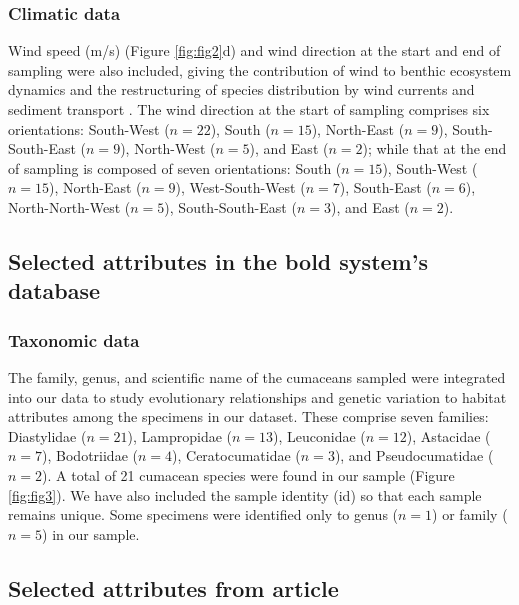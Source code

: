 \subsubsection{Climatic data} 
Wind speed (m/s) (Figure \ref{fig:fig2}d) and wind direction at the start and end of sampling were also included, giving the contribution of wind to benthic ecosystem dynamics and the restructuring of species distribution by wind currents and sediment transport \citep{siedlecki2016experiments, waga_recent_2020,saeedi_environmental_2022}. The wind direction at the start of sampling comprises six orientations: South-West ($n=22$), South ($n=15$), North-East ($n=9$), South-South-East ($n=9$), North-West ($n=5$), and East ($n=2$); while that at the end of sampling is composed of seven orientations: South ($n=15$), South-West ($n=15$), North-East ($n=9$), West-South-West ($n=7$), South-East ($n=6$), North-North-West ($n=5$), South-South-East ($n=3$), and East ($n=2$). 

\subsection{Selected attributes in the bold system's database}
\subsubsection{Taxonomic data} 
The family, genus, and scientific name of the cumaceans sampled were integrated into our data to study evolutionary relationships and genetic variation to habitat attributes among the specimens in our dataset. These comprise seven families: Diastylidae ($n=21$), Lampropidae ($n=13$), Leuconidae ($n=12$), Astacidae ($n=7$), Bodotriidae ($n=4$), Ceratocumatidae ($n=3$), and Pseudocumatidae ($n=2$). A total of 21 cumacean species were found in our sample (Figure \ref{fig:fig3}). We have also included the sample identity (id) so that each sample remains unique. Some specimens were identified only to genus ($n=1$) or family ($n=5$) in our sample.

\subsection{Selected attributes from article \cite{uhlir_adding_2021}} 
